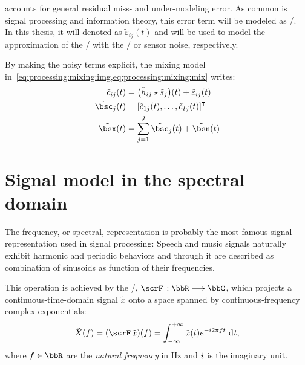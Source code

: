  accounts for general residual miss- and under-modeling error.
As common is signal processing and information theory, this error term will be modeled as \AWGN/.
\\In this thesis, it will denoted as $\tilde{\varepsilon}_{ij}( t)$ and will be used to model the
approximation of the \RIR/ with the \ISM/ or sensor noise, respectively.

\mynewline
By making the noisy terms explicit, the mixing model in~\cref{eq:processing:mixing:img,eq:processing:mixing:mix} writes:
\begin{align}
    \tilde{\img}_{\idxMic\idxSrc}(t) &=  \kparen{\tilde{\rir}_{\idxMic\idxSrc} \convCont \tilde{\src}_\idxSrc} (t) +  \tilde{\varepsilon}_{ij}(t)\\
    \tilde{\imgs}_\idxSrc(t)         &= \ktranspose{\klist{\tilde{\img}_{1\idxSrc}(t), \dots, \tilde{\img}_{\numMics\idxSrc}(t)}} \nonumber\\
    \tilde{\mics}(t)                 &= \sum_{\idxSrc=1}^{\numSrcs} \tilde{\imgs}_\idxSrc(t) + \tilde{\bsn}( t)
\end{align}

\section{Signal model in the spectral domain}\label{sec:processing:domains}%
The frequency, or spectral, representation is probably the most famous signal representation used in signal processing:
Speech and music signals naturally exhibit harmonic and periodic behaviors and
through it are described as combination of sinusoids as function of their frequencies.

This operation is achieved by the \FTdef/, $\fourierTrans{}:\bbR\kmapsto\bbC$, which projects a continuous-time-domain signal $\tilde{x}$ onto a space spanned by continuous-frequency complex exponentials:
\begin{equation}\label{eq:processing:ft}
    \tilde{X}(f) = (\fourierTrans{\tilde{x}})(f) =
        \int_{-\infty}^{+\infty}
        \tilde{x}(t)
        \cste^{-\csti 2 \pi f t}
        \,\kdiff{t}
    ,
\end{equation}
where $f \in \bbR$ are the \textit{natural frequency} in $\si{\Hz}$ and ${i}$ is the imaginary unit.

